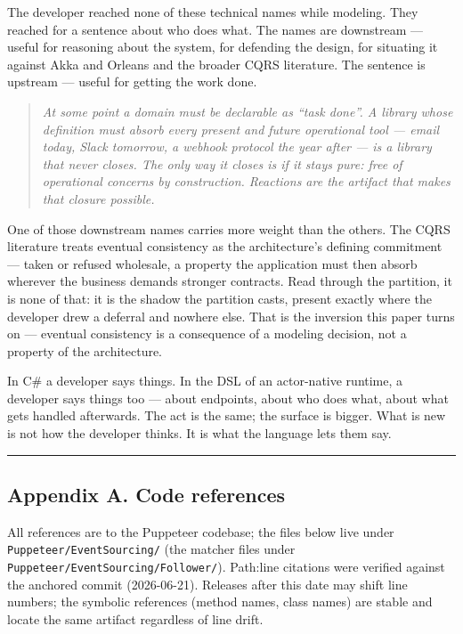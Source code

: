 \documentclass[
]{article}
\newcounter{none} %
\let\origtexttt\texttt%
\renewcommand{\texttt}[1]{\origtexttt{\seqsplit{#1}}}%
\let\texttt\origtexttt%
\begin{document}
The developer reached none of these technical names while modeling. They
reached for a sentence about who does what. The names are downstream ---
useful for reasoning about the system, for defending the design, for
situating it against Akka and Orleans and the broader CQRS literature.
The sentence is upstream --- useful for getting the work done.

\begin{quote}
\emph{At some point a domain must be declarable as ``task done''. A
library whose definition must absorb every present and future
operational tool --- email today, Slack tomorrow, a webhook protocol the
year after --- is a library that never closes. The only way it closes is
if it stays pure: free of operational concerns by construction.
Reactions are the artifact that makes that closure possible.}
\end{quote}

One of those downstream names carries more weight than the others. The
CQRS literature treats eventual consistency as the architecture's
defining commitment --- taken or refused wholesale, a property the
application must then absorb wherever the business demands stronger
contracts. Read through the partition, it is none of that: it is the
shadow the partition casts, present exactly where the developer drew a
deferral and nowhere else. That is the inversion this paper turns on ---
eventual consistency is a consequence of a modeling decision, not a
property of the architecture.

In C\# a developer says things. In the DSL of an actor-native runtime, a
developer says things too --- about endpoints, about who does what,
about what gets handled afterwards. The act is the same; the surface is
bigger. What is new is not how the developer thinks. It is what the
language lets them say.

\begin{center}\rule{0.5\linewidth}{0.5pt}\end{center}

\subsection{Appendix A. Code
references}\label{appendix-a.-code-references}

All references are to the Puppeteer codebase; the files below live under
\texttt{Puppeteer/EventSourcing/} (the matcher files under
\texttt{Puppeteer/EventSourcing/Follower/}). Path:line citations were
verified against the anchored commit (2026-06-21). Releases after this
date may shift line numbers; the symbolic references (method names,
class names) are stable and locate the same artifact regardless of line
drift.
\end{document}
